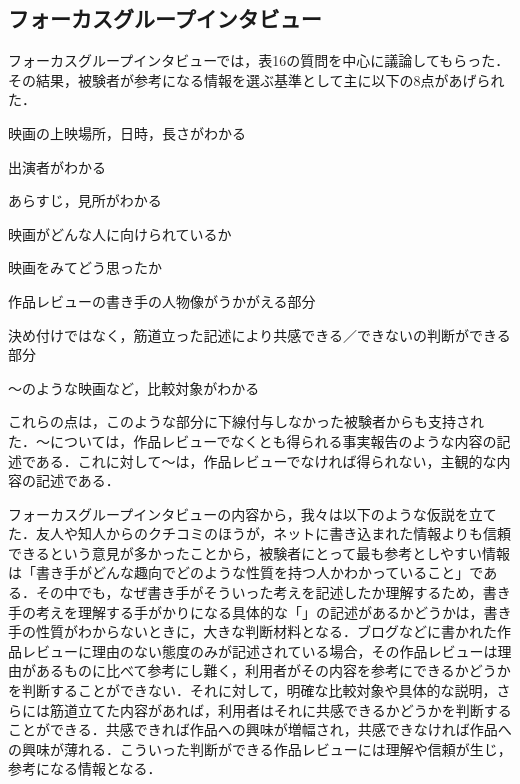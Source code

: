 \documentclass[japanese]{jnlp_1.3a}
\def\maru#1{}
\begin{document}
\begin{table}[p]

\end{table}

\subsection{フォーカスグループインタビュー}

フォーカスグループインタビューでは，表16の質問を中心に議論してもらった．その結果，被験者が参考になる情報を選ぶ基準として主に以下の8点があげられた．

\maru{1} 映画の上映場所，日時，長さがわかる

\maru{2} 出演者がわかる

\maru{3} あらすじ，見所がわかる

\maru{4} 映画がどんな人に向けられているか

\maru{5} 映画をみてどう思ったか

\maru{6} 作品レビューの書き手の人物像がうかがえる部分

\maru{7} 決め付けではなく，筋道立った記述により共感できる／できないの判断ができる部分

\maru{8} 〜のような映画など，比較対象がわかる

これらの点は，このような部分に下線付与しなかった被験者からも支持された．\maru{1}〜\maru{3}については，作品レビューでなくとも得られる事実報告のような内容の記述である．これに対して\maru{4}〜\maru{8}は，作品レビューでなければ得られない，主観的な内容の記述である． 

フォーカスグループインタビューの内容から，我々は以下のような仮説を立てた．友人や知人からのクチコミのほうが，ネットに書き込まれた情報よりも信頼できるという意見が多かったことから，被験者にとって最も参考としやすい情報は「書き手がどんな趣向でどのような性質を持つ人かわかっていること」である．その中でも，なぜ書き手がそういった考えを記述したか理解するため，書き手の考えを理解する手がかりになる具体的な「」の記述があるかどうかは，書き手の性質がわからないときに，大きな判断材料となる．ブログなどに書かれた作品レビューに理由のない態度のみが記述されている場合，その作品レビューは理由があるものに比べて参考にし難く，利用者がその内容を参考にできるかどうかを判断することができない．それに対して，明確な比較対象や具体的な説明，さらには筋道立てた内容があれば，利用者はそれに共感できるかどうかを判断することができる．共感できれば作品への興味が増幅され，共感できなければ作品への興味が薄れる．こういった判断ができる作品レビューには理解や信頼が生じ，参考になる情報となる．
\end{document}

